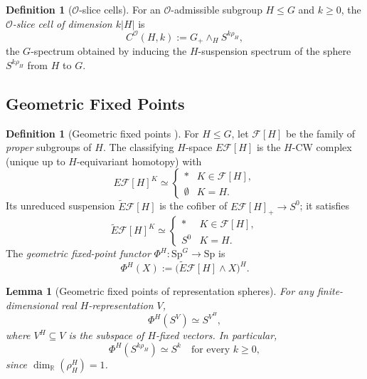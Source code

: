 \documentclass[12pt]{article}
\newtheorem{lemma}[theorem]{Lemma}
\theoremstyle{definition}
\newtheorem{definition}[theorem]{Definition}
\newcommand{\calO}{\mathcal{O}}
\newcommand{\Sp}{\mathrm{Sp}}
\newcommand{\SpG}{\mathrm{Sp}^G}
\begin{document}
\begin{definition}[$\calO$-slice cells]
\label{def:O-slice-cells}
For an $\calO$-admissible subgroup $H \leq G$ and $k \geq 0$, the \emph{$\calO$-slice cell
of dimension $k|H|$} is
\[
  C^{\calO}(H, k) := G_+ \wedge_H S^{k\rho_H},
\]
the $G$-spectrum obtained by inducing the $H$-suspension spectrum of the sphere $S^{k\rho_H}$
from $H$ to $G$.
\end{definition}

\subsection{Geometric Fixed Points}

\begin{definition}[Geometric fixed points {\cite{LMS1986,HHR2016}}]
\label{def:geom-fixed}
For $H \leq G$, let $\mathcal{F}[H]$ be the family of \emph{proper} subgroups of $H$.
The classifying $H$-space $E\mathcal{F}[H]$ is the $H$-CW complex (unique up to
$H$-equivariant homotopy) with
\[
  E\mathcal{F}[H]^K \simeq \begin{cases} * & K \in \mathcal{F}[H], \\ \emptyset & K = H. \end{cases}
\]
Its unreduced suspension $\widetilde{E}\mathcal{F}[H]$ is the cofiber of
$E\mathcal{F}[H]_+ \to S^0$; it satisfies
\[
  \widetilde{E}\mathcal{F}[H]^K \simeq \begin{cases} * & K \in \mathcal{F}[H], \\
  S^0 & K = H. \end{cases}
\]
The \emph{geometric fixed-point functor} $\Phi^H \colon \SpG \to \Sp$ is
\begin{equation}
\label{eq:geom-fixed-def}
  \Phi^H(X) := \bigl(\widetilde{E}\mathcal{F}[H] \wedge X\bigr)^H.
\end{equation}
\end{definition}

\begin{lemma}[Geometric fixed points of representation spheres]
\label{lem:geom-fixed-sphere}
For any finite-dimensional real $H$-representation $V$,
\begin{equation}
\label{eq:geom-fixed-sphere}
  \Phi^H(S^V) \simeq S^{V^H},
\end{equation}
where $V^H \subseteq V$ is the subspace of $H$-fixed vectors.
In particular,
\begin{equation}
\label{eq:geom-fixed-regular}
  \Phi^H(S^{k\rho_H}) \simeq S^k
  \quad \text{for every } k \geq 0,
\end{equation}
since $\dim_\mathbb{R}(\rho_H^H) = 1$.
\end{lemma}
\end{document}
